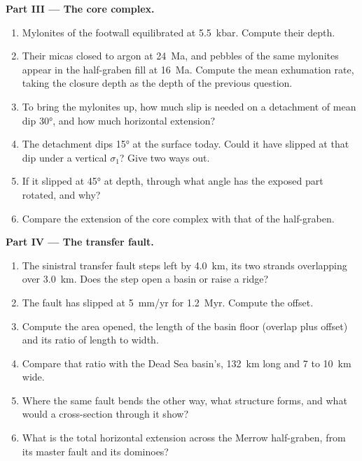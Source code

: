 \begin{problem}
\medskip\noindent\textbf{Part III --- The core complex.}
\begin{enumerate}[resume]
  \item Mylonites of the footwall equilibrated at \qty{5.5}{kbar}. Compute
        their depth.
  \item Their micas closed to argon at \qty{24}{Ma}, and pebbles of the same
        mylonites appear in the half-graben fill at \qty{16}{Ma}. Compute the
        mean exhumation rate, taking the closure depth as the depth of the
        previous question.
  \item To bring the mylonites up, how much slip is needed on a detachment
        of mean dip \ang{30}, and how much horizontal extension?
  \item The detachment dips \ang{15} at the surface today. Could it have
        slipped at that dip under a vertical $\sigma_1$? Give two ways out.
  \item If it slipped at \ang{45} at depth, through what angle has the
        exposed part rotated, and why?
  \item Compare the extension of the core complex with that of the
        half-graben.
\end{enumerate}

\medskip\noindent\textbf{Part IV --- The transfer fault.}
\begin{enumerate}[resume]
  \item The sinistral transfer fault steps left by \qty{4.0}{km}, its two
        strands overlapping over \qty{3.0}{km}. Does the step open a basin
        or raise a ridge?
  \item The fault has slipped at \qty{5}{mm/yr} for \qty{1.2}{Myr}. Compute
        the offset.
  \item Compute the area opened, the length of the basin floor (overlap plus
        offset) and its ratio of length to width.
  \item Compare that ratio with the Dead Sea basin's, \qty{132}{km} long and 7
        to \qty{10}{km} wide.
  \item Where the same fault bends the other way, what structure forms, and
        what would a cross-section through it show?
  \item What is the total horizontal extension across the Merrow half-graben,
        from its master fault and its dominoes?
\end{enumerate}
\end{problem}
